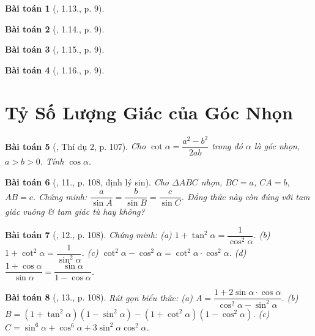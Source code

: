 \documentclass{article}
\newtheorem{baitoan}{Bài toán}
\begin{document}
\begin{baitoan}[\cite{TLCT_THCS_Toan_9_hinh_hoc}, 1.13., p. 9]
	
\end{baitoan}

\begin{baitoan}[\cite{TLCT_THCS_Toan_9_hinh_hoc}, 1.14., p. 9]
	
\end{baitoan}

\begin{baitoan}[\cite{TLCT_THCS_Toan_9_hinh_hoc}, 1.15., p. 9]
	
\end{baitoan}

\begin{baitoan}[\cite{TLCT_THCS_Toan_9_hinh_hoc}, 1.16., p. 9]
	
\end{baitoan}


\section{Tỷ Số Lượng Giác của Góc Nhọn}

\begin{baitoan}[\cite{Tuyen_Toan_9}, Thí dụ 2, p. 107]
	Cho $\cot\alpha = \dfrac{a^2 - b^2}{2ab}$ trong đó $\alpha$ là góc nhọn, $a > b > 0$. Tính $\cos\alpha$.
\end{baitoan}

\begin{baitoan}[\cite{Tuyen_Toan_9}, 11., p. 108, định lý sin]
	Cho $\Delta ABC$ nhọn, $BC = a$, $CA = b$, $AB = c$. Chứng minh: $\dfrac{a}{\sin A} = \dfrac{b}{\sin B} = \dfrac{c}{\sin C}$. Đẳng thức này còn đúng với tam giác vuông \& tam giác tù hay không?
\end{baitoan}

\begin{baitoan}[\cite{Tuyen_Toan_9}, 12., p. 108]
	Chứng minh: (a) $1 + \tan^2\alpha = \dfrac{1}{\cos^2\alpha}$. (b) $1 + \cot^2\alpha = \dfrac{1}{\sin^2\alpha}$. (c) $\cot^2\alpha - \cos^2\alpha = \cot^2\alpha\cdot\cos^2\alpha$. (d) $\dfrac{1 + \cos\alpha}{\sin\alpha} = \dfrac{\sin\alpha}{1 - \cos\alpha}$.
\end{baitoan}

\begin{baitoan}[\cite{Tuyen_Toan_9}, 13., p. 108]
	Rút gọn biểu thức: (a) $A = \dfrac{1 + 2\sin\alpha\cdot\cos\alpha}{\cos^2\alpha - \sin^2\alpha}$. (b) $B = (1 + \tan^2\alpha)(1 - \sin^2\alpha) - (1 + \cot^2\alpha)(1 - \cos^2\alpha)$. (c) $C = \sin^6\alpha + \cos^6\alpha + 3\sin^2\alpha\cos^2\alpha$.
\end{baitoan}
\end{document}
